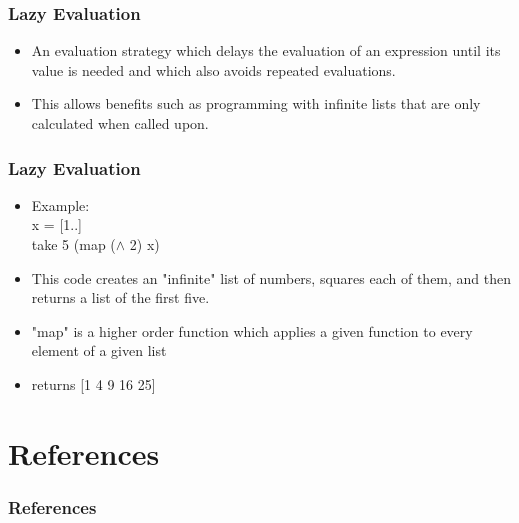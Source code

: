 \documentclass[presentation.tex]{subfiles}
\begin{document}
\begin{frame}
  \frametitle{Lazy Evaluation}
  	\begin{itemize}
\item   An evaluation strategy which delays the evaluation of an expression until its value is needed and which also avoids repeated evaluations. \\
 \item This allows benefits such as programming with infinite lists that are only calculated when called upon.
   \end{itemize}

\end{frame}


\begin{frame}
  \frametitle{Lazy Evaluation}
    	\begin{itemize}
 \item Example: \\ \;
  x = [1..] \\
  take 5 (map ($\wedge$ 2) x) \\
 \item This code creates an "infinite" list of numbers, squares each of them, and then returns a list of the first five. \\
 \item "map" is a higher order function which applies a given function to every element of a given list
\item returns [1 4 9 16 25]
	  \end{itemize} 
\end{frame}  

\section{References}
\begin{frame}
  \frametitle{References}


\end{frame}
\end{document}
